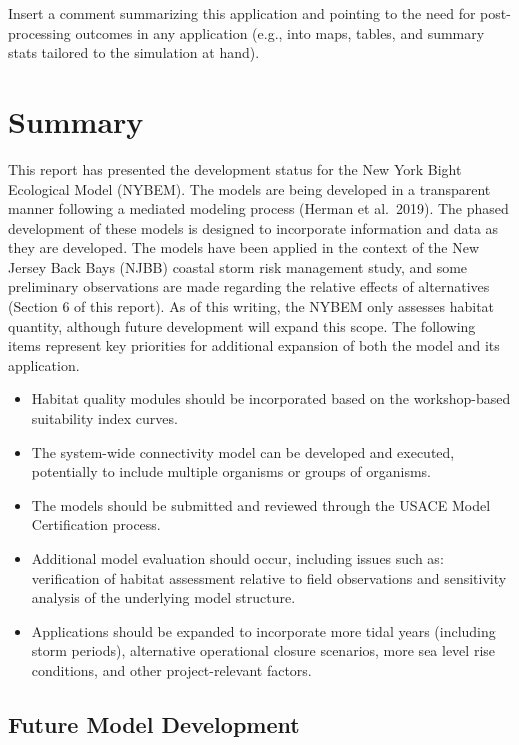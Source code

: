 \documentclass[
]{book}
\begin{document}
Insert a comment summarizing this application and pointing to the need for post-processing outcomes in any application (e.g., into maps, tables, and summary stats tailored to the simulation at hand).

\hypertarget{summary}{%
\chapter{Summary}\label{summary}}

This report has presented the development status for the New York Bight Ecological Model (NYBEM). The models are being developed in a transparent manner following a mediated modeling process (Herman et al.~2019). The phased development of these models is designed to incorporate information and data as they are developed. The models have been applied in the context of the New Jersey Back Bays (NJBB) coastal storm risk management study, and some preliminary observations are made regarding the relative effects of alternatives (Section 6 of this report).
As of this writing, the NYBEM only assesses habitat quantity, although future development will expand this scope. The following items represent key priorities for additional expansion of both the model and its application.

\begin{itemize}
\item
  Habitat quality modules should be incorporated based on the workshop-based suitability index curves.
\item
  The system-wide connectivity model can be developed and executed, potentially to include multiple organisms or groups of organisms.
\item
  The models should be submitted and reviewed through the USACE Model Certification process.
\item
  Additional model evaluation should occur, including issues such as: verification of habitat assessment relative to field observations and sensitivity analysis of the underlying model structure.
\item
  Applications should be expanded to incorporate more tidal years (including storm periods), alternative operational closure scenarios, more sea level rise conditions, and other project-relevant factors.
\end{itemize}

\hypertarget{future-model-development}{%
\section{Future Model Development}\label{future-model-development}}
\end{document}
